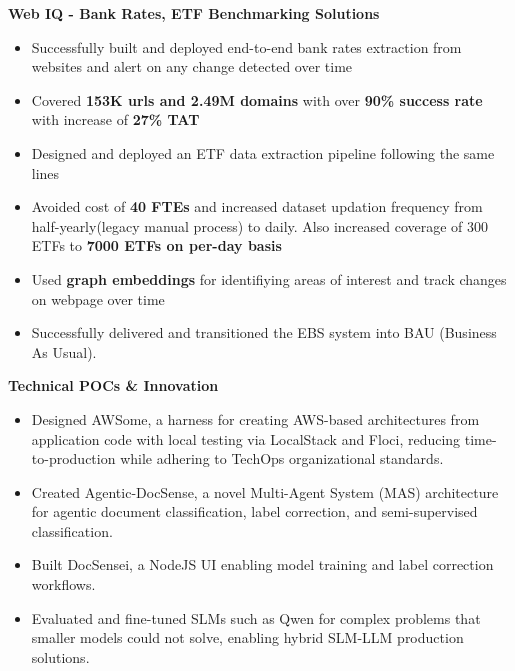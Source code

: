 \documentclass[letterpaper,11pt]{article}
\newcommand{\resumeProjectItem}[1]{
  \item\footnotesize{
    {#1 \vspace{-2pt}}
  }
}
\newcommand{\resumeProjectListStart}{\begin{itemize}[leftmargin=0.3in]}
\newcommand{\resumeProjectListEnd}{\end{itemize}\vspace{-3pt}}
\begin{document}
      \vspace{3pt}
      \textbf{Web IQ - Bank Rates, ETF Benchmarking Solutions}
      \resumeProjectListStart
        \resumeProjectItem{Successfully built and deployed end-to-end bank rates extraction from websites and alert on any change detected over time}
        \resumeProjectItem{Covered \textbf{153K urls and 2.49M domains} with over \textbf{90\% success rate} with increase of \textbf{27\% TAT}}
        \resumeProjectItem{Designed and deployed an ETF data extraction pipeline following the same lines}
        \resumeProjectItem{Avoided cost of \textbf{40 FTEs} and increased dataset updation frequency from half-yearly(legacy manual process) to daily. Also increased coverage of 300 ETFs to \textbf{7000 ETFs on per-day basis}}
        \resumeProjectItem{Used \textbf{graph embeddings} for identifiying areas of interest and track changes on webpage over time}
        \resumeProjectItem{Successfully delivered and transitioned the EBS system into BAU (Business As Usual).}
      \resumeProjectListEnd

      \vspace{3pt}
      \textbf{Technical POCs \& Innovation}
      \resumeProjectListStart
        \resumeProjectItem{Designed AWSome, a harness for creating AWS-based architectures from application code with local testing via LocalStack and Floci, reducing time-to-production while adhering to TechOps organizational standards.}
        \resumeProjectItem{Created Agentic-DocSense, a novel Multi-Agent System (MAS) architecture for agentic document classification, label correction, and semi-supervised classification.}
        \resumeProjectItem{Built DocSensei, a NodeJS UI enabling model training and label correction workflows.}
        \resumeProjectItem{Evaluated and fine-tuned SLMs such as Qwen for complex problems that smaller models could not solve, enabling hybrid SLM-LLM production solutions.}
      \resumeProjectListEnd
      
\end{document}
